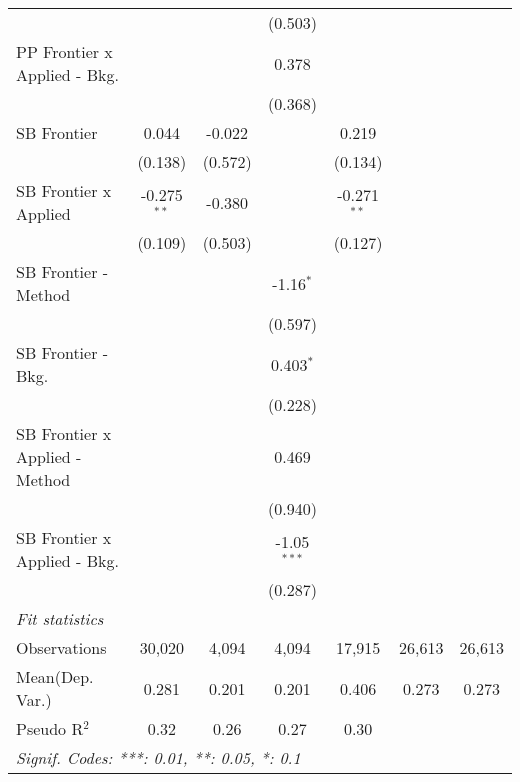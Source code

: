 \begin{tabular}{lcccccc}
                                  &               &              & (0.503)       &               &        &   \\   
   PP Frontier x Applied - Bkg.   &               &              & 0.378         &               &        &   \\   
                                  &               &              & (0.368)       &               &        &   \\   
   SB Frontier                    & 0.044         & -0.022       &               & 0.219         &        &   \\   
                                  & (0.138)       & (0.572)      &               & (0.134)       &        &   \\   
   SB Frontier x Applied          & -0.275$^{**}$ & -0.380       &               & -0.271$^{**}$ &        &   \\   
                                  & (0.109)       & (0.503)      &               & (0.127)       &        &   \\   
   SB Frontier - Method           &               &              & -1.16$^{*}$   &               &        &   \\   
                                  &               &              & (0.597)       &               &        &   \\   
   SB Frontier - Bkg.             &               &              & 0.403$^{*}$   &               &        &   \\   
                                  &               &              & (0.228)       &               &        &   \\   
   SB Frontier x Applied - Method &               &              & 0.469         &               &        &   \\   
                                  &               &              & (0.940)       &               &        &   \\   
   SB Frontier x Applied - Bkg.   &               &              & -1.05$^{***}$ &               &        &   \\   
                                  &               &              & (0.287)       &               &        &   \\   
   \midrule
   \emph{Fit statistics}\\
   Observations                   & 30,020        & 4,094        & 4,094         & 17,915        & 26,613 & 26,613\\  
Mean(Dep. Var.) & 0.281 & 0.201 & 0.201 & 0.406 & 0.273 & 0.273 \\
   Pseudo R$^2$                   & 0.32          & 0.26         & 0.27          & 0.30          &        & \\  
   \midrule \midrule
   \multicolumn{7}{l}{\emph{Signif. Codes: ***: 0.01, **: 0.05, *: 0.1}}\\
\end{tabular}
\par\endgroup
